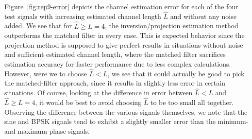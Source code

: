 \documentclass[11pt,titlepage]{report}
\begin{document}
Figure~\ref{fig:rep9-error} depicts the channel estimation error for each of the four test signals with increasing estimated channel length $\hat{L}$ and without any noise added. We see that for $\hat{L} \ge L = 4$, the inversion/projection estimation method outperforms the matched filter in every case. This is expected behavior since the projection method is supposed to give perfect results in situations without noise and sufficient estimated channel length, where the matched filter sacrifices estimation accuracy for faster performance due to less complex calculations.
However, were we to choose $\hat{L} < L$, we see that it could actually be good to pick the matched-filter approach, since it results in slightly less error in certain situations. Of course, looking at the difference in error between $\hat{L} < L$ and $\hat{L} \ge L = 4$, it would be best to avoid choosing $\hat{L}$ to be too small all together.
Observing the difference between the various signals themselves, we note that the sine and BPSK signals tend to exhibit a slightly smaller error than the minimum- and maximum-phase signals.
\end{document}
